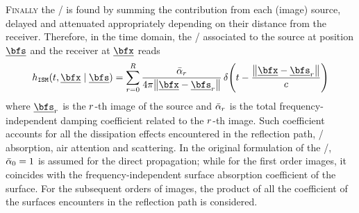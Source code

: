 

\textsc{Finally} the \RIR/ is found by summing the contribution from each (image) source, delayed and attenuated appropriately depending on their distance from the receiver.
Therefore, in the time domain, the \RIR/ associated to the source at position $\positionSource$ and the receiver at $\positionMicrophone$ reads
\begin{equation}\label{eq:acoustics:ims:time}
    \rir_{\mathtt{ISM}}(t, \positionMicrophone \mid \positionSource) =
    \sum_{\idxEch=0}^{\numEchs}
        \frac{\bar{\absCoeff}_{\idxEch}}{4 \pi \norm{\positionMicrophone - \positionSource_\idxEch}}
        \diracOf{t - \frac{\norm{\positionMicrophone - \positionSource_\idxEch}}{\speedOfSound}}
\end{equation}
where $\positionSource_\idxEch$ is the $r$-th image of the source and $\bar{\alpha}_{r}$
is the total frequency-independent damping coefficient related to the $r$-th image.
Such coefficient accounts for all the dissipation effects encountered in the reflection path, \eg/ absorption, air attention and scattering.
In the original formulation of the \ISM/, $\bar{\alpha}_{0} = 1$ is assumed for the direct propagation;
while for the first order images, it coincides with the frequency-independent surface absorption coefficient of the surface.
For the subsequent orders of images, the product of all the coefficient of the surfaces encounters in the reflection path is considered.

